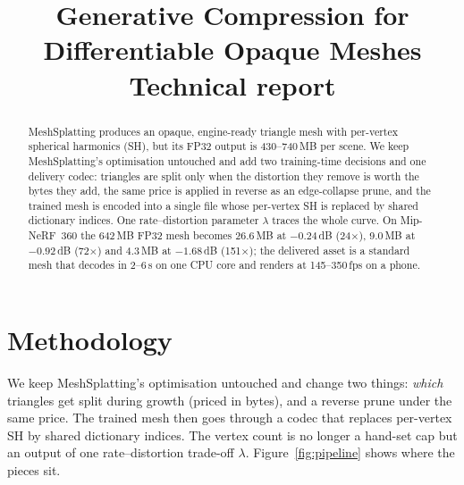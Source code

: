 \documentclass[11pt,a4paper]{article}
\title{Generative Compression for Differentiable Opaque Meshes\\[2pt]
\large Technical report}
\begin{document}
\maketitle

\begin{abstract}
MeshSplatting produces an opaque, engine-ready triangle mesh with per-vertex spherical harmonics (SH), but its FP32 output is 430--740\,MB per scene. We keep MeshSplatting's optimisation untouched and add two training-time decisions and one delivery codec: triangles are split only when the distortion they remove is worth the bytes they add, the same price is applied in reverse as an edge-collapse prune, and the trained mesh is encoded into a single file whose per-vertex SH is replaced by shared dictionary indices. One rate--distortion parameter $\lambda$ traces the whole curve. On Mip-NeRF~360 the 642\,MB FP32 mesh becomes 26.6\,MB at $-0.24$\,dB (24$\times$), 9.0\,MB at $-0.92$\,dB (72$\times$) and 4.3\,MB at $-1.68$\,dB (151$\times$); the delivered asset is a standard mesh that decodes in 2--6\,s on one CPU core and renders at 145--350\,fps on a phone.
\end{abstract}

\section{Methodology}
\label{sec:method}

We keep MeshSplatting's optimisation untouched and change two things: \emph{which} triangles get split during growth (priced in bytes), and a reverse prune under the same price. The trained mesh then goes through a codec that replaces per-vertex SH by shared dictionary indices. The vertex count is no longer a hand-set cap but an output of one rate--distortion trade-off $\lambda$. Figure~\ref{fig:pipeline} shows where the pieces sit.
\end{document}
